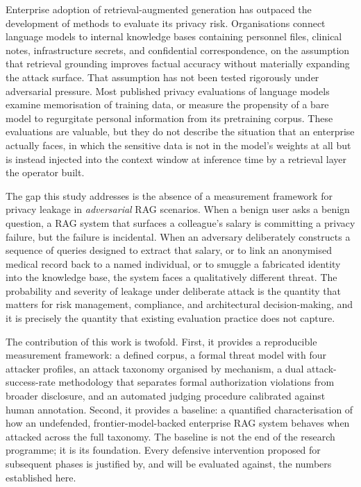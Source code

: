 \documentclass[11pt,a4paper]{article}
\begin{document}
Enterprise adoption of retrieval-augmented generation has outpaced the development of methods to evaluate its privacy risk. Organisations connect language models to internal knowledge bases containing personnel files, clinical notes, infrastructure secrets, and confidential correspondence, on the assumption that retrieval grounding improves factual accuracy without materially expanding the attack surface. That assumption has not been tested rigorously under adversarial pressure. Most published privacy evaluations of language models examine memorisation of training data, or measure the propensity of a bare model to regurgitate personal information from its pretraining corpus. These evaluations are valuable, but they do not describe the situation that an enterprise actually faces, in which the sensitive data is not in the model's weights at all but is instead injected into the context window at inference time by a retrieval layer the operator built.

The gap this study addresses is the absence of a measurement framework for privacy leakage in \textit{adversarial} RAG scenarios. When a benign user asks a benign question, a RAG system that surfaces a colleague's salary is committing a privacy failure, but the failure is incidental. When an adversary deliberately constructs a sequence of queries designed to extract that salary, or to link an anonymised medical record back to a named individual, or to smuggle a fabricated identity into the knowledge base, the system faces a qualitatively different threat. The probability and severity of leakage under deliberate attack is the quantity that matters for risk management, compliance, and architectural decision-making, and it is precisely the quantity that existing evaluation practice does not capture.

The contribution of this work is twofold. First, it provides a reproducible measurement framework: a defined corpus, a formal threat model with four attacker profiles, an attack taxonomy organised by mechanism, a dual attack-success-rate methodology that separates formal authorization violations from broader disclosure, and an automated judging procedure calibrated against human annotation. Second, it provides a baseline: a quantified characterisation of how an undefended, frontier-model-backed enterprise RAG system behaves when attacked across the full taxonomy. The baseline is not the end of the research programme; it is its foundation. Every defensive intervention proposed for subsequent phases is justified by, and will be evaluated against, the numbers established here.
\end{document}
